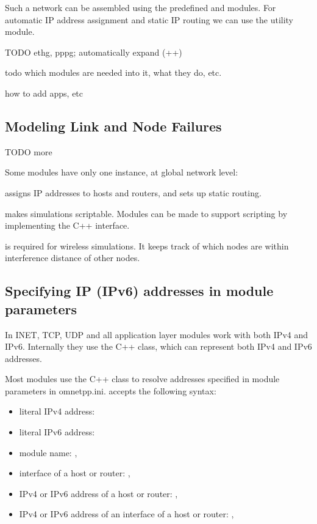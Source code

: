 Such a network can be assembled using the predefined 
and  modules. For automatic IP address assignment and
static IP routing we can use the  utility
module.

\ifdraft TODO
ethg, pppg;  automatically expand (++)

todo which modules are needed into it, what they do, etc.

how to add apps, etc
\fi

\subsection{Modeling Link and Node Failures}

\ifdraft TODO
more
\fi

Some modules have only one instance, at global network level:

 assigns IP addresses to hosts and routers,
and sets up static routing.

 makes simulations scriptable. Modules can be made to support
scripting by implementing the  C++ interface.

 is required for wireless simulations. It keeps track of which
nodes are within interference distance of other nodes.



\subsection{Specifying IP (IPv6) addresses in module parameters}

In INET, TCP, UDP and all application layer modules work with
both IPv4 and IPv6. Internally they use the  C++ class, which
can represent both IPv4 and IPv6 addresses.

Most modules use the  C++ class to resolve addresses
specified in module parameters in omnetpp.ini.
 accepts the following syntax:

\begin{itemize}
  \item literal IPv4 address: 
  \item literal IPv6 address: 
  \item module name: , 
  \item interface of a host or router: , 
  \item IPv4 or IPv6 address of a host or router: ,
  \item IPv4 or IPv6 address of an interface of a host or router:
      , 
\end{itemize}


